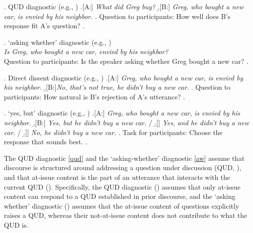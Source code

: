 \documentclass[times,linguex,xcolor]{glossa}
\begin{document}
  \ex. \label{qud}%
    QUD diagnostic (e.g., \citealt{tonhauser_diagnosing_2012,chen_presuppositions_2024})
    \a.[A:] \emph{What did Greg buy?}
    \b.[B:] \emph{Greg, who bought a new car, is envied by his neighbor.}
    \z.
    Question to participants: How well does B's response fit A's question?
  \z.

  \ex. \label{aw}%
    `asking whether' diagnostic (e.g., \citealt{tonhauser_how_2018,solstad_cataphoric_2024})\smallskip\\
      \emph{Is Greg, who bought a new car, envied by his neighbor?}\smallskip
  \\ Question to participants: Is the speaker asking whether Greg bought a new car?
  \z.

  \ex. \label{dd} Direct dissent diagnostic (e.g., \citealt{tonhauser_diagnosing_2012,syrett_experimental_2015})
    \a.[A:] \emph{Greg, who bought a new car, is envied by his neighbor.}
    \b.[B:]\emph{No, that's not true, he didn't buy a new car.}
    \z.
  Question to participants: How natural is B's rejection of A's utterance?
  \z.

  \ex. \label{yesbut}%
    `yes, but' diagnostic (e.g., \citealt{xue_correlation_2011,destruel_cross-linguistic_2015})
    \a.[A:] \emph{Greg, who bought a new car, is envied by his neighbor.}
    \b.[B:] \emph{Yes, but he didn't buy a new car.} /
    \b.[] \emph{Yes, and he didn't buy a new car.} /
    \b.[] \emph{No, he didn't buy a new car.}
    \z.
    Task for participants: Choose the response that sounds best.
  \z.

  The QUD diagnostic \ref{qud} and the ‘asking-whether’ diagnostic \ref{aw} assume that discourse is structured around addressing a question under discussion (QUD, \citealt{roberts_information_1996,ginzburg_interrogatives_1996}), and that at-issue content is the part of an utterance that interacts with the current QUD (\citealt{amaral_review_2007,simons_what_2010}). Specifically, the QUD diagnostic (\citealt{tonhauser_diagnosing_2012}) assumes that only at-issue content can respond to a QUD established in prior discourse, and the `asking whether' diagnostic (\citealt{tonhauser_how_2018}) assumes that the at-issue content of questions explicitly raises a QUD, whereas their not-at-issue content does not contribute to what the QUD is.
\end{document}
